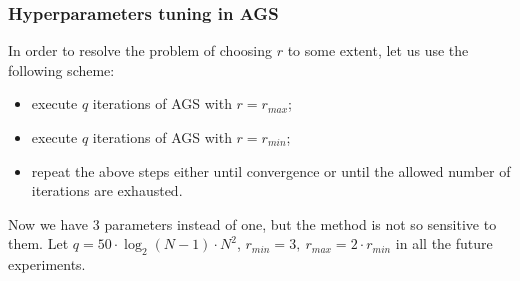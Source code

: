 \documentclass[aspectratio=1610]{beamer}
\begin{document}
\begin{frame}
  \frametitle{Hyperparameters tuning in AGS}
  In order to resolve the problem of choosing $r$ to some extent,
  let us use the following scheme:
  \begin{itemize}
    \item execute $q$ iterations of AGS with $r=r_{max}$;
    \item execute $q$ iterations of AGS with $r=r_{min}$;
    \item repeat the above steps either until convergence or until the allowed number of iterations are
  exhausted.
\end{itemize}
  Now we have 3 parameters instead of one, but the method is not so sensitive to them.
  Let $q=50\cdot\log_2(N-1)\cdot N^2$, $r_{min}=3,\:r_{max}=2\cdot r_{min}$ in all the future experiments.
\end{frame}
\end{document}
